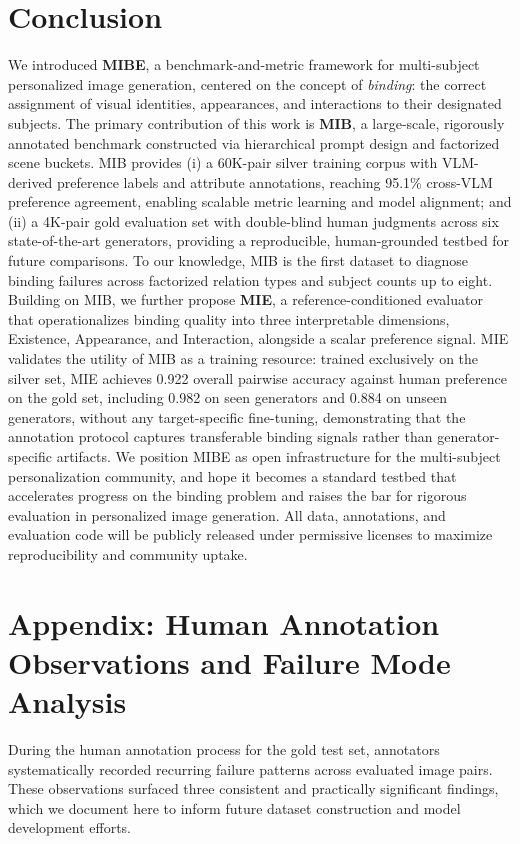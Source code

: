 \documentclass{article}
\begin{document}
\section{Conclusion}
We introduced \textbf{MIBE}, a benchmark-and-metric framework for multi-subject personalized image generation, centered on the concept of \emph{binding}: the correct assignment of visual identities, appearances, and interactions to their designated subjects.
The primary contribution of this work is \textbf{MIB}, a large-scale, rigorously annotated benchmark constructed via hierarchical prompt design and factorized scene buckets.  
MIB provides (i) a 60K-pair silver training corpus with VLM-derived preference labels and attribute annotations, reaching 95.1\% cross-VLM preference agreement, enabling scalable metric learning and model alignment; and (ii) a 4K-pair gold evaluation set with double-blind human judgments across six state-of-the-art generators, providing a reproducible, human-grounded testbed for future comparisons.  
To our knowledge, MIB is the first dataset to diagnose binding failures across factorized relation types and subject counts up to eight.
Building on MIB, we further propose \textbf{MIE}, a reference-conditioned evaluator that operationalizes binding quality into three interpretable dimensions, Existence, Appearance, and Interaction, alongside a scalar preference signal.  
MIE validates the utility of MIB as a training resource: trained exclusively on the silver set, MIE achieves 0.922 overall pairwise accuracy against human preference on the gold set, including 0.982 on seen generators and 0.884 on unseen generators, without any target-specific fine-tuning, demonstrating that the annotation protocol captures transferable binding signals rather than generator-specific artifacts.
We position MIBE as open infrastructure for the multi-subject personalization community, and hope it becomes a standard testbed that accelerates progress on the binding problem and raises the bar for rigorous evaluation in personalized image generation.
All data, annotations, and evaluation code will be publicly released under permissive licenses to maximize reproducibility and community uptake.



  



\newpage
\appendix


\section{Appendix: Human Annotation Observations and Failure Mode Analysis}
\label{sec:appendix_failure_modes}
During the human annotation process for the gold test set, annotators systematically recorded recurring failure patterns across evaluated image pairs. These observations surfaced three consistent and practically significant findings, which we document here to inform future dataset construction and model development efforts.
\end{document}
